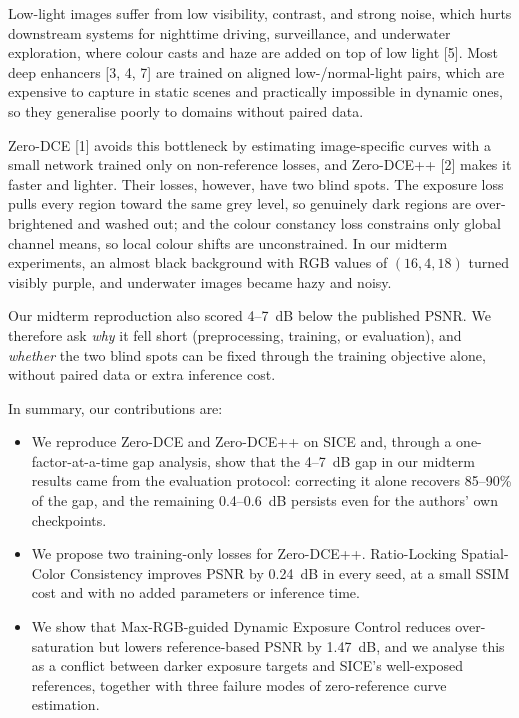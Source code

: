 \documentclass[11pt, letterpaper]{article}
\begin{document}
Low-light images suffer from low visibility, contrast, and strong noise, which
hurts downstream systems for nighttime driving, surveillance, and underwater
exploration, where colour casts and haze are added on top of low light [5]. Most deep enhancers [3, 4, 7] are trained on aligned
low-/normal-light pairs, which are expensive to capture in static scenes and
practically impossible in dynamic ones, so they generalise poorly to domains without
paired data.

Zero-DCE [1] avoids this bottleneck by estimating image-specific curves with a
small network trained only on non-reference losses, and Zero-DCE++ [2] makes it
faster and lighter. Their losses, however, have two blind spots. The exposure loss pulls every region toward the same grey level, so
genuinely dark regions are over-brightened and washed out; and the colour
constancy loss constrains only global channel means, so local colour shifts are
unconstrained. In our midterm experiments, an almost black background with RGB
values of $(16, 4, 18)$ turned visibly purple, and underwater images became hazy
and noisy.

Our midterm reproduction also scored 4--7~dB below the published PSNR. We
therefore ask \emph{why} it fell short (preprocessing, training, or evaluation),
and \emph{whether} the two blind spots can be fixed through the training objective
alone, without paired data or extra inference cost.

In summary, our contributions are:
\begin{itemize}[noitemsep]
  \item We reproduce Zero-DCE and Zero-DCE++ on SICE and, through a
    one-factor-at-a-time gap analysis, show that the 4--7~dB gap in our midterm
    results came from the evaluation protocol: correcting it alone recovers
    85--90\% of the gap, and the remaining 0.4--0.6~dB persists even for the
    authors' own checkpoints.
  \item We propose two training-only losses for Zero-DCE++. Ratio-Locking
    Spatial-Color Consistency improves PSNR by 0.24~dB in every seed, at a small
    SSIM cost and with no added parameters or inference time.
  \item We show that Max-RGB-guided Dynamic Exposure Control reduces
    over-saturation but lowers reference-based PSNR by 1.47~dB, and we analyse this
    as a conflict between darker exposure targets and SICE's well-exposed
    references, together with three failure modes of zero-reference curve
    estimation.
\end{itemize}
\end{document}

